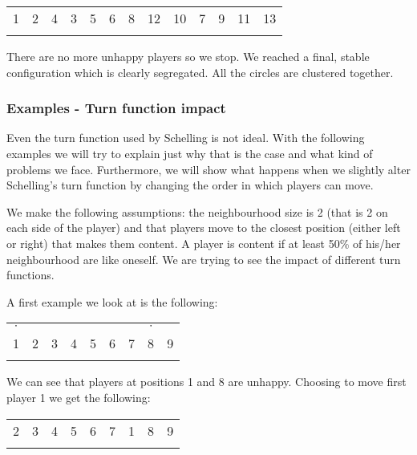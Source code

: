 \documentclass[../main.tex]{subfiles}
\begin{document}
\begin{table}[H]
\begin{center}
{\begin{tabular}{| c |c| c| c| c |c| c |c| c |c|c|c|c|}
\hline
  1 & 2 &4 &3 &5 &6   &8  & 12 &10&7& 9 & 11 & 13 \\
\x &\x &\x &\z &\z &\z  &\z &\z &\z & \x&\x &\x & \x\\
 \hline
\end{tabular}}
\end{center}
\end{table}

There are no more unhappy players so we stop. We reached a final, stable configuration which is clearly segregated. All the circles are clustered together. 


\subsubsection{Examples - Turn function impact}
Even the turn function used by Schelling is not ideal. With the following examples we will try to explain just why that is the case and what kind of problems we face. Furthermore, we will show what happens when we slightly alter Schelling's turn function by changing the order in which players can move.

We make the following assumptions: the neighbourhood size is 2 (that is 2 on each side of the player) and that players move to the closest position (either left or right) that makes them content. A player is content if at least 50\% of his/her neighbourhood are like oneself. We are trying to see the impact of different turn functions.

A first example we look at is the following:
\begin{table}[H]
\begin{center}
{\begin{tabular}{| c |c| c| c| c |c| c |c| c |}
\hline
$\cdot$ &  & & & &  & & $\cdot$ & \\
1 & 2 &3 &4 &5 &6  &7 &8 &9 \\
\x &\z &\z &\z &\z  &\z &\z &\x & \x \\
 \hline
\end{tabular}}
\end{center}
\end{table}

We can see that players at positions 1 and 8 are unhappy. Choosing to move first player 1 we get the following:

\begin{table}[H]
\begin{center}
{\begin{tabular}{| c |c| c| c| c |c| c |c| c |}
\hline
 2 &3 &4 &5 &6  &7 &1 &8 &9 \\
\z &\z &\z &\z  &\z &\z &\x &\x & \x \\
 \hline
\end{tabular}}
\end{center}
\end{table}
\end{document}
